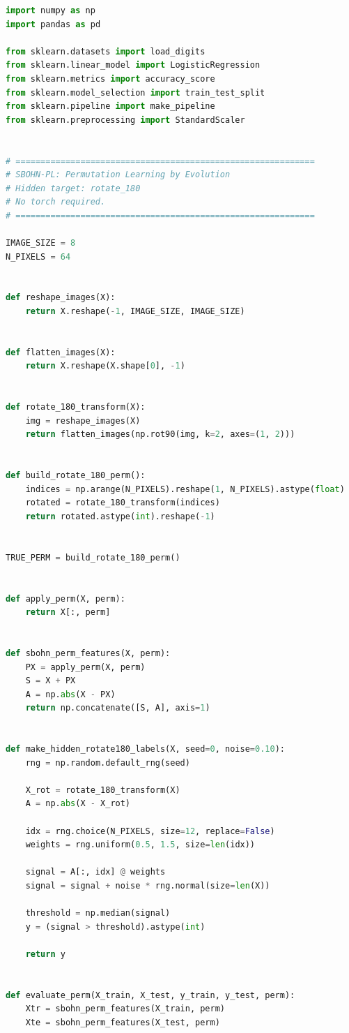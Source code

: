 \documentclass[11pt,a4paper]{report}
\begin{document}
\label{app:ch5-lst1}
\begin{lstlisting}[language=Python]
import numpy as np
import pandas as pd

from sklearn.datasets import load_digits
from sklearn.linear_model import LogisticRegression
from sklearn.metrics import accuracy_score
from sklearn.model_selection import train_test_split
from sklearn.pipeline import make_pipeline
from sklearn.preprocessing import StandardScaler


# ============================================================
# SBOHN-PL: Permutation Learning by Evolution
# Hidden target: rotate_180
# No torch required.
# ============================================================

IMAGE_SIZE = 8
N_PIXELS = 64


def reshape_images(X):
    return X.reshape(-1, IMAGE_SIZE, IMAGE_SIZE)


def flatten_images(X):
    return X.reshape(X.shape[0], -1)


def rotate_180_transform(X):
    img = reshape_images(X)
    return flatten_images(np.rot90(img, k=2, axes=(1, 2)))


def build_rotate_180_perm():
    indices = np.arange(N_PIXELS).reshape(1, N_PIXELS).astype(float)
    rotated = rotate_180_transform(indices)
    return rotated.astype(int).reshape(-1)


TRUE_PERM = build_rotate_180_perm()


def apply_perm(X, perm):
    return X[:, perm]


def sbohn_perm_features(X, perm):
    PX = apply_perm(X, perm)
    S = X + PX
    A = np.abs(X - PX)
    return np.concatenate([S, A], axis=1)


def make_hidden_rotate180_labels(X, seed=0, noise=0.10):
    rng = np.random.default_rng(seed)

    X_rot = rotate_180_transform(X)
    A = np.abs(X - X_rot)

    idx = rng.choice(N_PIXELS, size=12, replace=False)
    weights = rng.uniform(0.5, 1.5, size=len(idx))

    signal = A[:, idx] @ weights
    signal = signal + noise * rng.normal(size=len(X))

    threshold = np.median(signal)
    y = (signal > threshold).astype(int)

    return y


def evaluate_perm(X_train, X_test, y_train, y_test, perm):
    Xtr = sbohn_perm_features(X_train, perm)
    Xte = sbohn_perm_features(X_test, perm)


\end{lstlisting}
\end{document}
